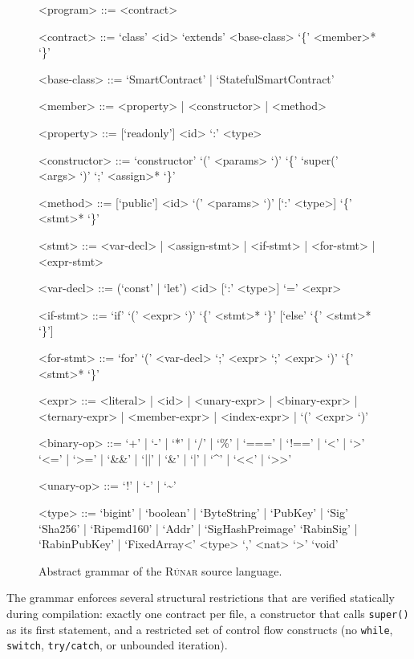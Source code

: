 \documentclass[11pt,a4paper]{article}
\newcommand{\runar}{\textsc{Rúnar}}
\begin{document}
\begin{figure}[h]
\begin{grammar}
<program> ::= <contract>

<contract> ::= `class' <id> `extends' <base-class> `\{' <member>* `\}'

<base-class> ::= `SmartContract' | `StatefulSmartContract'

<member> ::= <property> | <constructor> | <method>

<property> ::= [`readonly'] <id> `:' <type>

<constructor> ::= `constructor' `(' <params> `)' `\{' `super(' <args> `)' `;' <assign>* `\}'

<method> ::= [`public'] <id> `(' <params> `)' [`:' <type>] `\{' <stmt>* `\}'

<stmt> ::= <var-decl> | <assign-stmt> | <if-stmt> | <for-stmt>
        | <expr-stmt>

<var-decl> ::= (`const' | `let') <id> [`:' <type>] `=' <expr>

<if-stmt> ::= `if' `(' <expr> `)' `\{' <stmt>* `\}' [`else' `\{' <stmt>* `\}']

<for-stmt> ::= `for' `(' <var-decl> `;' <expr> `;' <expr> `)' `\{' <stmt>* `\}'

<expr> ::= <literal> | <id> | <unary-expr> | <binary-expr> | <ternary-expr>
        | <member-expr> | <index-expr> | `(' <expr> `)'

<binary-op> ::= `+' | `-' | `*' | `/' | `\%' | `===' | `!==' | `<' | `>'
           \alt `<=' | `>=' | `\&\&' | `||' | `\&' | `|' | `\^{}' | `<<' | `>>'

<unary-op> ::= `!' | `-' | `\textasciitilde'

<type> ::= `bigint' | `boolean' | `ByteString' | `PubKey' | `Sig'
      \alt `Sha256' | `Ripemd160' | `Addr' | `SigHashPreimage'
      \alt `RabinSig' | `RabinPubKey' | `FixedArray<' <type> `,' <nat> `>'
      \alt `void'
\end{grammar}
\caption{Abstract grammar of the \runar{} source language.}
\label{fig:grammar}
\end{figure}

The grammar enforces several structural restrictions that are verified
statically during compilation: exactly one contract per file, a constructor
that calls \texttt{super()} as its first statement, and a restricted set of
control flow constructs (no \texttt{while}, \texttt{switch}, \texttt{try/catch},
or unbounded iteration).

\end{document}
